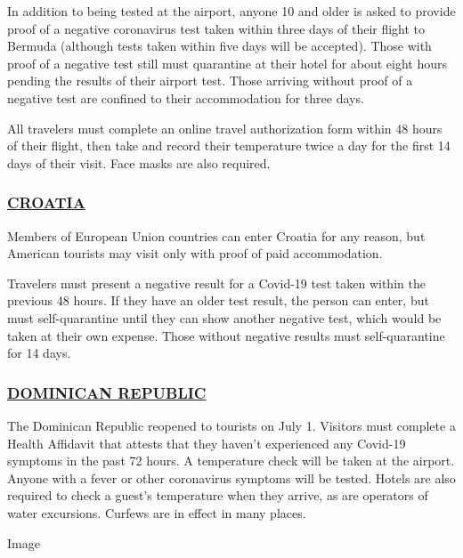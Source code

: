 In addition to being tested at the airport, anyone 10 and older is asked
to provide proof of a negative coronavirus test taken within three days
of their flight to Bermuda (although tests taken within five days will
be accepted). Those with proof of a negative test still must quarantine
at their hotel for about eight hours pending the results of their
airport test. Those arriving without proof of a negative test are
confined to their accommodation for three days.

All travelers must complete an online travel authorization form within
48 hours of their flight, then take and record their temperature twice a
day for the first 14 days of their visit. Face masks are also required.

\hypertarget{croatia}{%
\subsubsection{\texorpdfstring{\href{https://mup.gov.hr/uzg-covid/english/286212}{CROATIA}}{CROATIA}}\label{croatia}}

Members of European Union countries can enter Croatia for any reason,
but American tourists may visit only with proof of paid accommodation.

Travelers must present a negative result for a Covid-19 test taken
within the previous 48 hours. If they have an older test result, the
person can enter, but must self-quarantine until they can show another
negative test, which would be taken at their own expense. Those without
negative results must self-quarantine for 14 days.

\hypertarget{dominican-republic}{%
\subsubsection{\texorpdfstring{\href{https://www.godominicanrepublic.com/newsroom/coronavirus/}{DOMINICAN
REPUBLIC}}{DOMINICAN REPUBLIC}}\label{dominican-republic}}

The Dominican Republic reopened to tourists on July 1. Visitors must
complete a Health Affidavit that attests that they haven't experienced
any Covid-19 symptoms in the past 72 hours. A temperature check will be
taken at the airport. Anyone with a fever or other coronavirus symptoms
will be tested. Hotels are also required to check a guest's temperature
when they arrive, as are operators of water excursions. Curfews are in
effect in many places.

Image

